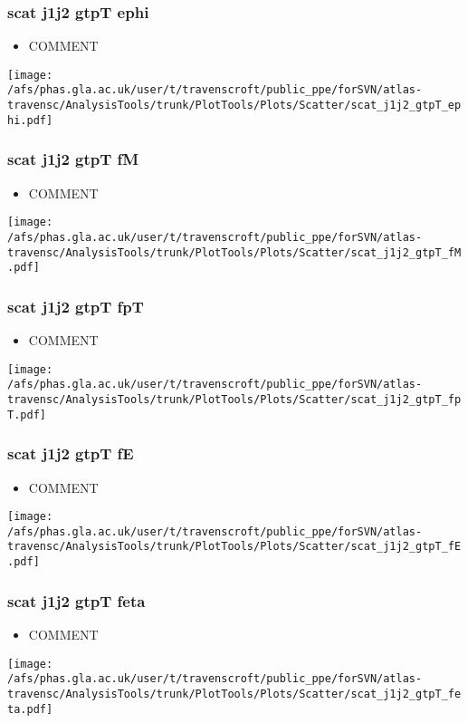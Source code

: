 \documentclass{beamer}
\begin{document}
\begin{frame}
\frametitle{scat j1j2 gtpT ephi}
\begin{itemize}
\item COMMENT
\end{itemize}
\begin{center}
\texttt{[image: /afs/phas.gla.ac.uk/user/t/travenscroft/public\_ppe/forSVN/atlas-travensc/AnalysisTools/trunk/PlotTools/Plots/Scatter/scat\_j1j2\_gtpT\_ephi.pdf]}
\end{center}
\end{frame}

\begin{frame}
\frametitle{scat j1j2 gtpT fM}
\begin{itemize}
\item COMMENT
\end{itemize}
\begin{center}
\texttt{[image: /afs/phas.gla.ac.uk/user/t/travenscroft/public\_ppe/forSVN/atlas-travensc/AnalysisTools/trunk/PlotTools/Plots/Scatter/scat\_j1j2\_gtpT\_fM.pdf]}
\end{center}
\end{frame}

\begin{frame}
\frametitle{scat j1j2 gtpT fpT}
\begin{itemize}
\item COMMENT
\end{itemize}
\begin{center}
\texttt{[image: /afs/phas.gla.ac.uk/user/t/travenscroft/public\_ppe/forSVN/atlas-travensc/AnalysisTools/trunk/PlotTools/Plots/Scatter/scat\_j1j2\_gtpT\_fpT.pdf]}
\end{center}
\end{frame}

\begin{frame}
\frametitle{scat j1j2 gtpT fE}
\begin{itemize}
\item COMMENT
\end{itemize}
\begin{center}
\texttt{[image: /afs/phas.gla.ac.uk/user/t/travenscroft/public\_ppe/forSVN/atlas-travensc/AnalysisTools/trunk/PlotTools/Plots/Scatter/scat\_j1j2\_gtpT\_fE.pdf]}
\end{center}
\end{frame}

\begin{frame}
\frametitle{scat j1j2 gtpT feta}
\begin{itemize}
\item COMMENT
\end{itemize}
\begin{center}
\texttt{[image: /afs/phas.gla.ac.uk/user/t/travenscroft/public\_ppe/forSVN/atlas-travensc/AnalysisTools/trunk/PlotTools/Plots/Scatter/scat\_j1j2\_gtpT\_feta.pdf]}
\end{center}
\end{frame}
\end{document}
